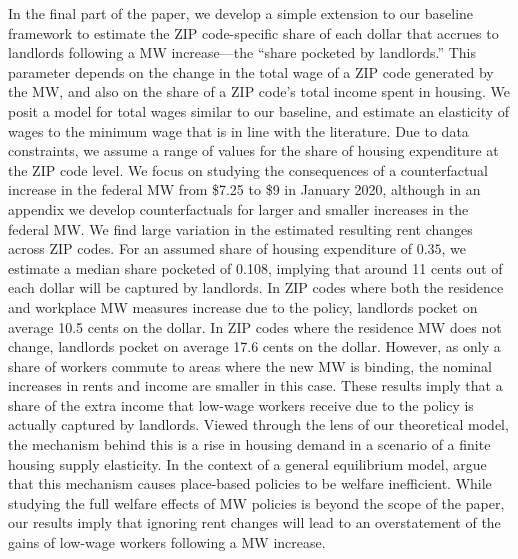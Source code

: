 
In the final part of the paper, we develop a simple extension to our baseline 
framework to estimate the ZIP code-specific share of each dollar that accrues to 
landlords following a MW increase---the ``share pocketed by landlords.''
This parameter depends on the change in the total wage of a ZIP code generated
by the MW, and also on the share of a ZIP code's total income spent in housing.
We posit a model for total wages similar to our baseline, and estimate an 
elasticity of wages to the minimum wage that is in line with the literature.
Due to data constraints, we assume a range of values for the share of housing
expenditure at the ZIP code level.
We focus on studying the consequences of a counterfactual increase in the federal 
MW from \$7.25 to \$9 in January 2020, although in an appendix we develop 
counterfactuals for larger and smaller increases in the federal MW.
We find large variation in the estimated resulting rent changes across ZIP codes.
For an assumed share of housing expenditure of $0.35$, we estimate a median
share pocketed of 0.108, implying that around 11 cents out of each dollar will 
be captured by landlords.
In ZIP codes where both the residence and workplace MW measures increase due to 
the policy, landlords pocket on average 10.5 cents on the dollar.
In ZIP codes where the residence MW does not change, landlords pocket on average
17.6 cents on the dollar.
However, as only a share of workers commute to areas where the new MW is 
binding, the nominal increases in rents and income are smaller in this case.
These results imply that a share of the extra income that low-wage workers
receive due to the policy is actually captured by landlords.
Viewed through the lens of our theoretical model,
the mechanism behind this is a rise in housing demand in a scenario of a 
finite housing supply elasticity.
In the context of a general equilibrium model, \textcite{KlineMoretti2014} argue
that this mechanism causes place-based policies to be welfare inefficient.
While studying the full welfare effects of MW policies is beyond the scope of 
the paper, our results imply that ignoring rent changes will lead to an 
overstatement of the gains of low-wage workers following a MW increase.

